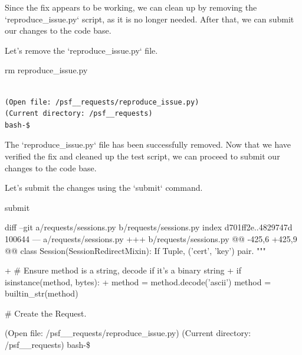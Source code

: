 {\begin{agentbox}
Since the fix appears to be working, we can clean up by removing the `reproduce\_issue.py` script, as it is no longer needed. After that, we can submit our changes to the code base.



Let's remove the `reproduce\_issue.py` file.

\hrulefill
\begin{CodeVerbatim}[breaklines=true, breakanywhere=true]
rm reproduce_issue.py
\end{CodeVerbatim}
\end{agentbox}
\begin{observationbox}\begin{Verbatim}[breaklines=true, breakanywhere=true]

(Open file: /psf__requests/reproduce_issue.py)
(Current directory: /psf__requests)
bash-$
\end{Verbatim}
\end{observationbox}
\begin{agentbox}
The `reproduce\_issue.py` file has been successfully removed. Now that we have verified the fix and cleaned up the test script, we can proceed to submit our changes to the code base.



Let's submit the changes using the `submit` command.

\hrulefill
\begin{CodeVerbatim}[breaklines=true, breakanywhere=true]
submit
\end{CodeVerbatim}
\end{agentbox}
\begin{observationbox}
\begin{CodeVerbatim}[breaklines=true, breakanywhere=true]
diff --git a/requests/sessions.py b/requests/sessions.py
index d701ff2e..4829747d 100644
--- a/requests/sessions.py
+++ b/requests/sessions.py
@@ -425,6 +425,9 @@ class Session(SessionRedirectMixin):
             If Tuple, ('cert', 'key') pair.
         """
 
+        # Ensure method is a string, decode if it's a binary string
+        if isinstance(method, bytes):
+            method = method.decode('ascii')
         method = builtin_str(method)
 
         # Create the Request.

(Open file: /psf__requests/reproduce_issue.py)
(Current directory: /psf__requests)
bash-\$
\end{CodeVerbatim}
\end{observationbox}

}
